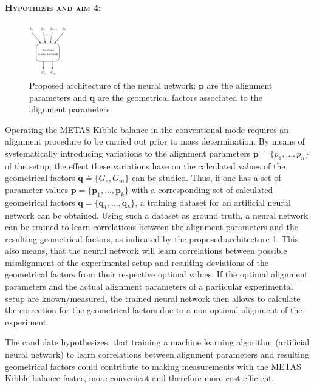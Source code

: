 \documentclass{article}
\newcommand\matr[1]{\ensuremath{\boldsymbol{\mathbf{#1}}}}
\newcommand\vect[1]{\ensuremath{\bm{#1}}}
\begin{document}
\paragraph*{\normalfont \textsc{Hypothesis and aim 4:}}
\begin{figure}
	\centering
	\includegraphics[width=0.15\textwidth]{figures/nn.pdf}
	\caption{Proposed architecture of the neural network; $\vect{p}$ are the alignment parameters and $\vect{q}$ are the geometrical factors associated to the alignment parameters.}
	\label{fig:nn}
\end{figure}
Operating the METAS Kibble balance in the conventional mode requires an alignment procedure to be carried out prior to mass determination. 
By means of systematically introducing variations to the alignment parameters $\vect{p} \doteq \{p_1,\dots,p_n\}$ of the setup, the effect these variations have on the calculated values of the geometrical factors $\vect{q} \doteq \{G_e, G_m\}$ can be studied. Thus, if one has a set of parameter values $\matr{p} = \{\vect{p}_1,\dots,\vect{p}_k\}$ with a corresponding set of calculated geometrical factors $\matr{q} = \{\vect{q}_1,\dots,\vect{q}_k\}$, a training dataset for an artificial neural network can be obtained. Using such a dataset as ground truth, a neural network can be trained to learn correlations between the alignment parameters and the resulting geometrical factors, as indicated by the proposed architecture \cref{fig:nn}.
This also means, that the neural network will learn correlations between possible misalignment of the experimental setup and resulting deviations of the geometrical factors from their respective optimal values. If the optimal alignment parameters and the actual alignment parameters of a particular experimental setup are known/measured, the trained neural network then allows to calculate the correction for the geometrical factors due to a non-optimal alignment of the experiment. 

The candidate hypothesizes, that training a machine learning algorithm (artificial neural network) to learn correlations between alignment parameters and resulting geometrical factors could contribute to making measurements with the METAS Kibble balance faster, more convenient and therefore more cost-efficient.
\end{document}
